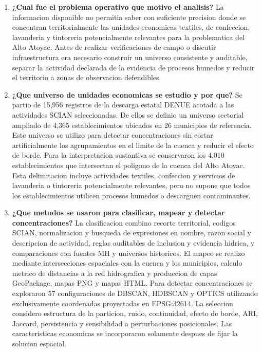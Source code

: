 \documentclass[11pt,letterpaper]{article}
\begin{document}
\begin{enumerate}
    \item \textbf{¿Cual fue el problema operativo que motivo el analisis?}
    La informacion disponible no permitia saber con suficiente precision donde se concentran territorialmente las unidades economicas textiles, de confeccion, lavanderia y tintoreria potencialmente relevantes para la problematica del Alto Atoyac. Antes de realizar verificaciones de campo o discutir infraestructura era necesario construir un universo consistente y auditable, separar la actividad declarada de la evidencia de procesos humedos y reducir el territorio a zonas de observacion defendibles.

    \item \textbf{¿Que universo de unidades economicas se estudio y por que?}
    Se partio de 15,956 registros de la descarga estatal DENUE acotada a las actividades SCIAN seleccionadas. De ellos se definio un universo sectorial ampliado de 4,365 establecimientos ubicados en 26 municipios de referencia. Este universo se utilizo para detectar concentraciones sin cortar artificialmente los agrupamientos en el limite de la cuenca y reducir el efecto de borde. Para la interpretacion sustantiva se conservaron los 4,010 establecimientos que intersectan el poligono de la cuenca del Alto Atoyac. Esta delimitacion incluye actividades textiles, confeccion y servicios de lavanderia o tintoreria potencialmente relevantes, pero no supone que todos los establecimientos utilicen procesos humedos o descarguen contaminantes.

    \item \textbf{¿Que metodos se usaron para clasificar, mapear y detectar concentraciones?}
    La clasificacion combino recorte territorial, codigos SCIAN, normalizacion y busqueda de expresiones en nombre, razon social y descripcion de actividad, reglas auditables de inclusion y evidencia hidrica, y comparaciones con fuentes MH y universos historicos. El mapeo se realizo mediante intersecciones espaciales con la cuenca y los municipios, calculo metrico de distancias a la red hidrografica y produccion de capas GeoPackage, mapas PNG y mapas HTML. Para detectar concentraciones se exploraron 57 configuraciones de DBSCAN, HDBSCAN y OPTICS utilizando exclusivamente coordenadas proyectadas en EPSG:32614. La seleccion considero estructura de la particion, ruido, continuidad, efecto de borde, ARI, Jaccard, persistencia y sensibilidad a perturbaciones posicionales. Las caracteristicas economicas se incorporaron solamente despues de fijar la solucion espacial.


\end{enumerate}
\end{document}
